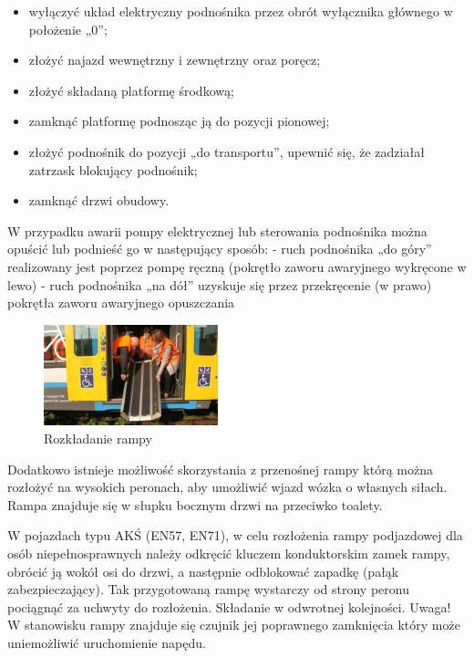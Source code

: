 \begin{itemize}
	\item wyłączyć układ elektryczny podnośnika przez obrót wyłącznika głównego w położenie „0”;
	\item złożyć najazd wewnętrzny i zewnętrzny oraz poręcz;
	\item złożyć składaną platformę środkową;
	\item zamknąć platformę podnosząc ją do pozycji pionowej;
	\item złożyć podnośnik do pozycji „do transportu”, upewnić się, że zadziałał zatrzask blokujący podnośnik;
	\item zamknąć drzwi obudowy.
\end{itemize}
W przypadku awarii pompy elektrycznej lub sterowania podnośnika można opuścić lub podnieść go w następujący sposób:
- ruch podnośnika „do góry” realizowany jest poprzez pompę ręczną (pokrętło zaworu awaryjnego wykręcone w lewo)
- ruch podnośnika „na dół” uzyskuje się przez przekręcenie (w prawo) pokrętła zaworu awaryjnego opuszczania

\begin{figure}
	\includegraphics[width=0.45\textwidth]{skryptkierownik-img/skryptkierownik-img054.jpg}
	\caption{Rozkładanie rampy}
\end{figure}
Dodatkowo istnieje możliwość skorzystania z przenośnej rampy którą można rozłożyć na wysokich peronach, aby umożliwić wjazd wózka o własnych siłach. Rampa znajduje się w słupku bocznym drzwi na przeciwko toalety. 

W pojazdach typu AKŚ (EN57, EN71), w celu rozłożenia rampy podjazdowej dla osób niepełnosprawnych należy odkręcić kluczem konduktorskim zamek rampy, obrócić ją wokół osi do drzwi, a następnie odblokować zapadkę (pałąk zabezpieczający). Tak przygotowaną rampę wystarczy od strony peronu pociągnąć za uchwyty do rozłożenia. Składanie w odwrotnej kolejności. Uwaga! W stanowisku rampy znajduje się czujnik jej poprawnego zamknięcia który może uniemożliwić uruchomienie napędu.

